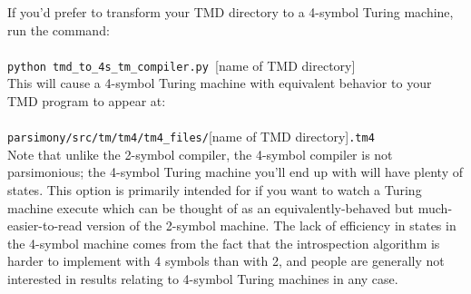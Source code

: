 \documentclass[11pt]{article}
\begin{document}
If you'd prefer to transform your TMD directory to a 4-symbol Turing machine, run the command: \\ \\
\texttt{python tmd_to_4s_tm_compiler.py }[name of TMD directory] \\

This will cause a 4-symbol Turing machine with equivalent behavior to your TMD program to appear at: \\ \\
\texttt{parsimony/src/tm/tm4/tm4_files/}[name of TMD directory]\texttt{.tm4} \\

Note that unlike the 2-symbol compiler, the 4-symbol compiler is not parsimonious; the 4-symbol Turing machine you'll end up with will have plenty of states. This option is primarily intended for if you want to watch a Turing machine execute which can be thought of as an equivalently-behaved but much-easier-to-read version of the 2-symbol machine. The lack of efficiency in states in the 4-symbol machine comes from the fact that the introspection algorithm is harder to implement with 4 symbols than with 2, and people are generally not interested in results relating to 4-symbol Turing machines in any case.
\end{document}
